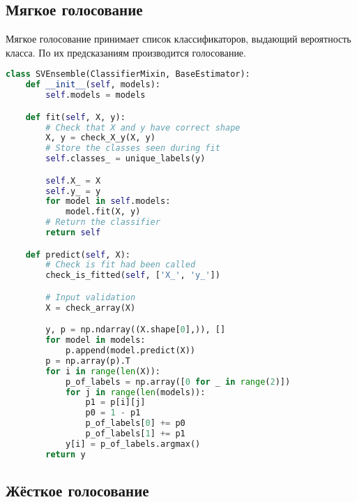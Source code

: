 \subsection{Мягкое голосование}

Мягкое голосование принимает список классификаторов, выдающий вероятность класса. По их предсказаниям производится голосование.
\begin{lstlisting}[language=Python]
class SVEnsemble(ClassifierMixin, BaseEstimator):
    def __init__(self, models):
        self.models = models

    def fit(self, X, y):
        # Check that X and y have correct shape
        X, y = check_X_y(X, y)
        # Store the classes seen during fit
        self.classes_ = unique_labels(y)

        self.X_ = X
        self.y_ = y
        for model in self.models:
            model.fit(X, y)
        # Return the classifier
        return self

    def predict(self, X):
        # Check is fit had been called
        check_is_fitted(self, ['X_', 'y_'])

        # Input validation
        X = check_array(X)

        y, p = np.ndarray((X.shape[0],)), []
        for model in models:
            p.append(model.predict(X))
        p = np.array(p).T
        for i in range(len(X)):
            p_of_labels = np.array([0 for _ in range(2)])
            for j in range(len(models)):
                p1 = p[i][j]
                p0 = 1 - p1
                p_of_labels[0] += p0
                p_of_labels[1] += p1
            y[i] = p_of_labels.argmax()
        return y
\end{lstlisting}
\pagebreak

\subsection{Жёсткое голосование}

